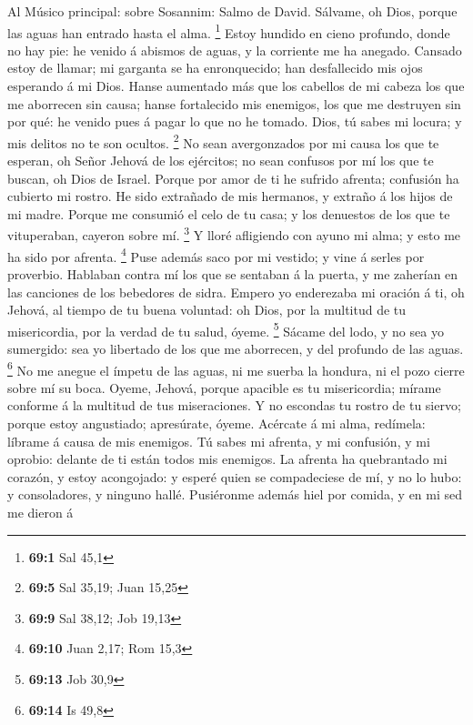  Al Músico principal: sobre Sosannim: Salmo de David.
Sálvame, oh Dios, porque las aguas han entrado hasta el alma.
\footnote{\textbf{69:1} Sal 45,1}  Estoy hundido en cieno
profundo, donde no hay pie: he venido á abismos de aguas, y la corriente
me ha anegado.  Cansado estoy de llamar; mi garganta se ha
enronquecido; han desfallecido mis ojos esperando á mi Dios.
 Hanse aumentado más que los cabellos de mi cabeza los que
me aborrecen sin causa; hanse fortalecido mis enemigos, los que me
destruyen sin por qué: he venido pues á pagar lo que no he tomado.
 Dios, tú sabes mi locura; y mis delitos no te son ocultos.
\footnote{\textbf{69:5} Sal 35,19; Juan 15,25}  No sean
avergonzados por mi causa los que te esperan, oh Señor Jehová de los
ejércitos; no sean confusos por mí los que te buscan, oh Dios de Israel.
 Porque por amor de ti he sufrido afrenta; confusión ha
cubierto mi rostro.  He sido extrañado de mis hermanos, y
extraño á los hijos de mi madre.  Porque me consumió el celo
de tu casa; y los denuestos de los que te vituperaban, cayeron sobre mí.
\footnote{\textbf{69:9} Sal 38,12; Job 19,13}  Y lloré
afligiendo con ayuno mi alma; y esto me ha sido por afrenta. \footnote{\textbf{69:10}
  Juan 2,17; Rom 15,3}  Puse además saco por mi vestido; y
vine á serles por proverbio.  Hablaban contra mí los que se
sentaban á la puerta, y me zaherían en las canciones de los bebedores de
sidra.  Empero yo enderezaba mi oración á ti, oh Jehová, al
tiempo de tu buena voluntad: oh Dios, por la multitud de tu
misericordia, por la verdad de tu salud, óyeme. \footnote{\textbf{69:13}
  Job 30,9}  Sácame del lodo, y no sea yo sumergido: sea yo
libertado de los que me aborrecen, y del profundo de las aguas.
\footnote{\textbf{69:14} Is 49,8}  No me anegue el ímpetu
de las aguas, ni me suerba la hondura, ni el pozo cierre sobre mí su
boca.  Oyeme, Jehová, porque apacible es tu misericordia;
mírame conforme á la multitud de tus miseraciones.  Y no
escondas tu rostro de tu siervo; porque estoy angustiado; apresúrate,
óyeme.  Acércate á mi alma, redímela: líbrame á causa de
mis enemigos.  Tú sabes mi afrenta, y mi confusión, y mi
oprobio: delante de ti están todos mis enemigos.  La
afrenta ha quebrantado mi corazón, y estoy acongojado: y esperé quien se
compadeciese de mí, y no lo hubo: y consoladores, y ninguno hallé.
 Pusiéronme además hiel por comida, y en mi sed me dieron á
